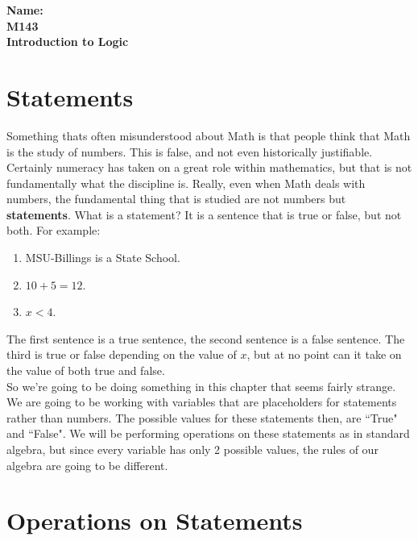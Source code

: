 \documentclass[10pt]{article}
\theoremstyle{definition}
\begin{document}
%

{\bf Name:} \hrulefill\hrulefill\hrulefill\\
{\bf M143} \qquad \qquad \\
{\bf Introduction to Logic}\\ %



\section{Statements}

Something thats often misunderstood about Math is that people think that Math is the study of numbers.  This is false, and not even historically justifiable.  Certainly numeracy has taken on a great role within mathematics, but that is not fundamentally what the discipline is.  Really, even when Math deals with numbers, the fundamental thing that is studied are not numbers but {\bf statements}.  What is a statement?  It is a sentence that is true or false, but not both.  For example:

\begin{enumerate}
\item MSU-Billings is a State School.
\item $10+5=12$.
\item $x<4$.
\end{enumerate}

The first sentence is a true sentence, the second sentence is a false sentence.  The third is true or false depending on the value of $x$, but at no point can it take on the value of both true and false.\\

So we're going to be doing something in this chapter that seems fairly strange. We are going to be working with variables that are placeholders for statements rather than numbers.  The possible values for these statements then, are ``True" and ``False".  We will be performing operations on these statements as in standard algebra, but since every variable has only 2 possible values, the rules of our algebra are going to be different.


\section{Operations on Statements}
\end{document}
